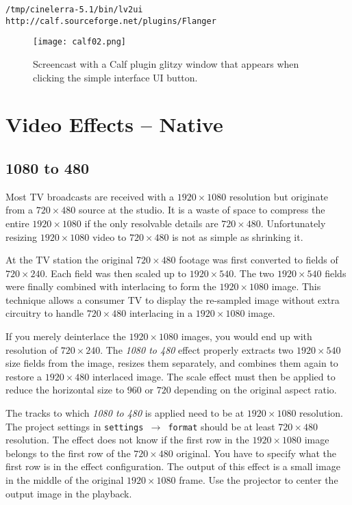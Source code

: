 \begin{lstlisting}[style=sh]
/tmp/cinelerra-5.1/bin/lv2ui http://calf.sourceforge.net/plugins/Flanger
\end{lstlisting}

\begin{figure}[htpb]
    \centering
    \texttt{[image: calf02.png]}
    \caption{Screencast with a Calf plugin glitzy window that appears when clicking the simple interface UI button.}
    \label{fig:calf02}
\end{figure}

\section[Video Effects --- Native]{Video Effects -- Native}%
\label{sec:video_effects_native}

\subsection{1080 to 480}%
\label{sub:1080_to_480}

Most TV broadcasts are received with a $1920\times1080$ resolution but originate from a $720\times480$ source at the studio. It is a waste of space to compress the entire $1920\times1080$ if the only resolvable details are $720\times480$. Unfortunately resizing $1920\times1080$ video to $720\times480$ is not as simple as shrinking it.

At the TV station the original $720\times480$ footage was first converted to fields of $720\times240$. Each field was then scaled up to $1920\times540$. The two $1920\times540$ fields were finally combined with interlacing to form the $1920\times1080$ image. This technique allows a consumer TV to display the re-sampled image without extra circuitry to handle $720\times480$ interlacing in a $1920\times1080$ image.

If you merely deinterlace the $1920\times1080$ images, you would end up with resolution of $720\times240$. The \textit{1080 to 480} effect properly extracts two $1920\times540$ size fields from the image, resizes them separately, and combines them again to restore a $1920\times480$ interlaced image. The scale effect must then be applied to reduce the horizontal size to $960$ or $720$ depending on the original aspect ratio.

The tracks to which \textit{1080 to 480} is applied need to be at $1920\times1080$ resolution. The project settings in \texttt{settings $\rightarrow$ format} should be at least $720\times480$ resolution. The effect does not know if the first row in the $1920\times1080$ image belongs to the first row of the $720\times480$ original. You have to specify what the first row is in the effect configuration. The output of this effect is a small image in the middle of the original $1920\times1080$ frame. Use the projector to center the output image in the playback.

